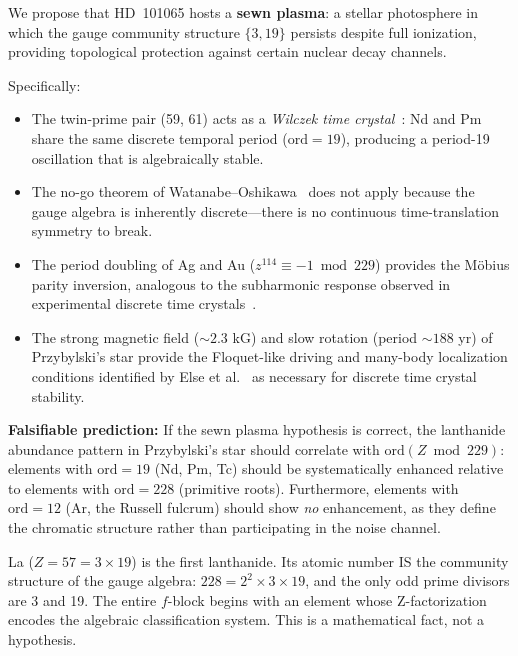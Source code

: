 \begin{hypothesis}
\label{hyp:przybylski}
We propose that HD~101065 hosts a \textbf{sewn plasma}: a stellar photosphere in which the gauge community structure $\{3, 19\}$ persists despite full ionization, providing topological protection against certain nuclear decay channels.

Specifically:
\begin{itemize}[noitemsep]
  \item The twin-prime pair (59, 61) acts as a \emph{Wilczek time crystal}~\cite{wilczek2012}: Nd and Pm share the same discrete temporal period ($\mathrm{ord} = 19$), producing a period-19 oscillation that is algebraically stable.
  \item The no-go theorem of Watanabe--Oshikawa~\cite{watanabe2015} does not apply because the gauge algebra is inherently discrete---there is no continuous time-translation symmetry to break.
  \item The period doubling of Ag and Au ($z^{114} \equiv -1 \bmod 229$) provides the M\"obius parity inversion, analogous to the subharmonic response observed in experimental discrete time crystals~\cite{zhang2017, mi2022}.
  \item The strong magnetic field ($\sim 2.3$ kG) and slow rotation (period $\sim 188$ yr) of Przybylski's star provide the Floquet-like driving and many-body localization conditions identified by Else et al.~\cite{else2016} as necessary for discrete time crystal stability.
\end{itemize}

\textbf{Falsifiable prediction:} If the sewn plasma hypothesis is correct, the lanthanide abundance pattern in Przybylski's star should correlate with $\mathrm{ord}(Z \bmod 229)$: elements with $\mathrm{ord} = 19$ (Nd, Pm, Tc) should be systematically enhanced relative to elements with $\mathrm{ord} = 228$ (primitive roots). Furthermore, elements with $\mathrm{ord} = 12$ (Ar, the Russell fulcrum) should show \emph{no} enhancement, as they define the chromatic structure rather than participating in the noise channel.
\end{hypothesis}

\begin{remark}
La ($Z = 57 = 3 \times 19$) is the first lanthanide. Its atomic number IS the community structure of the gauge algebra: $228 = 2^2 \times 3 \times 19$, and the only odd prime divisors are 3 and 19. The entire $f$-block begins with an element whose Z-factorization encodes the algebraic classification system. This is a mathematical fact, not a hypothesis.
\end{remark}

